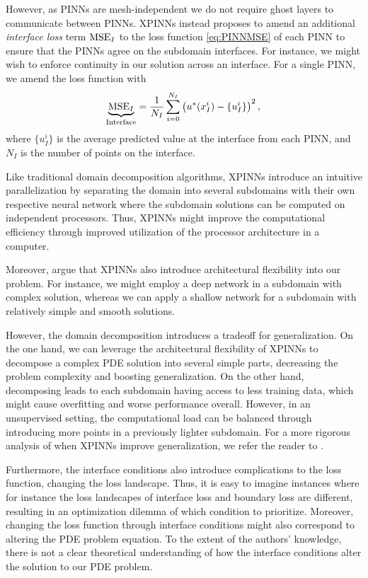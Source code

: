 However, as PINNs are mesh-independent we do not require ghost layers to communicate between PINNs.
XPINNs instead proposes to amend an additional \textit{interface loss} term $\operatorname{MSE}_I$ to the loss function \eqref{eq:PINNMSE} of each PINN to ensure that the PINNs agree on the subdomain interfaces.
For instance, we might wish to enforce continuity in our solution across an interface.
For a single PINN, we amend the loss function with
\begin{equation}\label{eq:MSE_I}
    \underbrace{\operatorname{MSE}_I}_{\text{Interface}} = \frac{1}{N_I} \sum_{i = 0}^{N_I} \left( u^*(x_I^i) - \{u_I^i\} \right)^2,  \\
\end{equation}
where $\{u_I^i\}$ is the average predicted value at the interface from each PINN, and $N_I$ is the number of points on the interface. 

Like traditional domain decomposition algorithms, XPINNs introduce an intuitive parallelization by separating the domain into several subdomains with their own respective neural network where the subdomain solutions can be computed on independent processors.
Thus, XPINNs might improve the computational efficiency through improved utilization of the processor architecture in a computer.

Moreover, \textcite{Jagtap2020ExtendedPN} argue that XPINNs also introduce architectural flexibility into our problem.
For instance, we might employ a deep network in a subdomain with complex solution, whereas we can apply a shallow network for a subdomain with relatively simple and smooth solutions. 

However, the domain decomposition introduces a tradeoff for generalization.
On the one hand, we can leverage the architectural flexibility of XPINNs to decompose a complex PDE solution into several simple parts, decreasing the problem complexity and boosting generalization.
On the other hand, decomposing leads to each subdomain having access to less training data, which might cause overfitting and worse performance overall.
However, in an unsupervised setting, the computational load can be balanced through introducing more points in a previously lighter subdomain.
For a more rigorous analysis of when XPINNs improve generalization, we refer the reader to \cite{XPINN_generalize}.

Furthermore, the interface conditions also introduce complications to the loss function, changing the loss landscape.
Thus, it is easy to imagine instances where for instance the loss landscapes of interface loss and boundary loss are different, resulting in an optimization dilemma of which condition to prioritize.
Moreover, changing the loss function through interface conditions might also correspond to altering the PDE problem equation.
To the extent of the authors' knowledge, there is not a clear theoretical understanding of how the interface conditions alter the solution to our PDE problem. 

